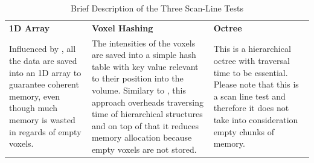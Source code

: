 \documentclass{subfiles}
\begin{document}
\begin{table}[!htbp]
	\renewcommand{\arraystretch}{1.3}
	
	\centering
	\begin{tabular}{|P{0.3\textwidth}|P{0.3\textwidth}|P{0.3\textwidth}|}
			
		\hline
		\textbf{1D Array} &	\textbf{Voxel Hashing} & \textbf{Octree}  \\
		\hlinewd{1.5pt}
		Influenced by \cite{Hadwiger2012}, all the data are saved into an 1D array to guarantee coherent memory, even though much memory is wasted in regards of empty voxels. &	The intensities of the voxels are saved into a simple hash table with key value relevant to their position into the volume. Similary to \cite{Nievner2016voxelHashing}, this approach overheads traversing time of hierarchical structures and on top of that it reduces memory allocation because empty voxels are not stored.  &  This is a  hierarchical octree with traversal time to be essential. Please note that this is a scan line test and therefore it does not take into consideration empty chunks of memory.\\	
		\hline
	\end{tabular}
	\caption{Brief Description of the Three Scan-Line Tests}
	\label{tab:DataStructuresScanline}
\end{table}
\end{document}
